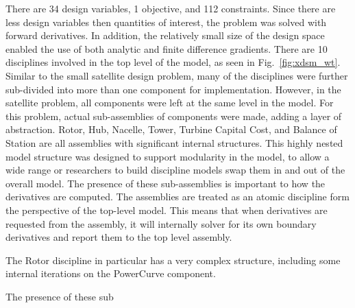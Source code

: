\documentclass[]{aiaa-tc} %
\begin{document}
    There are 34 design variables, 1 objective, and 112 constraints. Since there are
    less design variables then quantities of interest, the problem was solved with
    forward derivatives. In addition, the relatively small size of the design space
    enabled the use of both analytic and finite difference gradients. There are 10 disciplines 
    involved in the top level of the model, as seen in Fig.~\ref{fig:xdsm_wt}. Similar to the small 
    satellite design problem, many of the disciplines were further
    sub-divided into more than one component for implementation. However, in the
    satellite problem, all components were left at the same level in the model. For this problem, 
    actual sub-assemblies of components were made, adding a layer of abstraction. Rotor, 
    Hub, Nacelle, Tower, Turbine Capital Cost, and Balance of Station are all 
    assemblies with significant internal structures. This highly nested model structure was 
    designed to support modularity in the model, to allow a wide range or researchers to build 
    discipline models swap them in and out of the overall model. The presence of these 
    sub-assemblies is important to how the derivatives are computed. The assemblies are
    treated as an atomic discipline form the perspective of the top-level model. This means that
    when derivatives are requested from the assembly, it will internally solver for its own 
    boundary derivatives and report them to the top level assembly. 

    The Rotor discipline in particular has a very complex structure, including some internal 
    iterations on the PowerCurve component. 

    The presence of these sub
\end{document}
